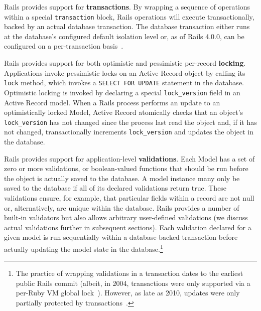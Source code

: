\begin{myenumerate}
\item Rails provides support for \textbf{transactions}. By wrapping a
sequence of operations within a special \texttt{transaction} block,
Rails operations will execute transactionally, backed by an actual
database transaction. The database transaction either runs at the
database's configured default isolation level or, as of Rails 4.0.0, can
be configured on a per-transaction
basis~\cite{code-transaction-isolation}.

\item Rails provides support for both optimistic and pessimistic
  per-record \textbf{locking}. Applications invoke pessimistic locks
  on an Active Record object by calling its \texttt{lock} method,
  which invokes a \texttt{SELECT FOR UPDATE} statement in the
  database. Optimistic locking is invoked by declaring a special
  \texttt{lock\_version} field in an Active Record model. When a Rails
  process performs an update to an optimistically locked Model, Active
  Record atomically checks that an object's \texttt{lock\_version} has
  not changed since the process last read the object and, if it has
  not changed, transactionally increments \texttt{lock\_version} and updates the
  object in the database.

\item Rails provides support for application-level
  \textbf{validations}. Each Model has a set of zero or more
  validations, or boolean-valued functions that should be run before
  the object is actually saved to the database. A model instance many
  only be saved to the database if all of its declared validations
  return true. These validations ensure, for example, that particular
  fields within a record are not null or, alternatively, are unique
  within the database. Rails provides a number of built-in validators
  but also allows arbitrary user-defined validations (we discuss
  actual validations further in subsequent sections). Each validation
  declared for a given model is run sequentially within a
  database-backed transaction before actually updating the model state
  in the database.\footnote{The practice
    of wrapping validations in a transaction dates to the earliest public
    Rails commit (albeit, in 2004, transactions were only supported via a
    per-Ruby VM global lock~\cite{code-txn-lock}). However,
    as late as 2010, updates were only partially protected by
    transactions~\cite{code-txn-update}.}\\[-2mm]


\end{myenumerate}
